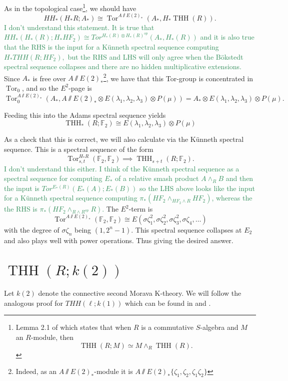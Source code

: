\documentclass[12pt]{amsart}
\newcommand{\mmod}{\! \sslash \!}
\newcommand{\F}{\mathbb{F}}
\DeclareMathOperator{\Tor}{Tor}
\DeclareMathOperator{\THH}{THH}
\def \AE2{A\mmod E(2)_*}
\renewcommand{\AE}[1]{A\mmod E(#1)_*}
\theoremstyle{definition}
\numberwithin{equation}{section}
\numberwithin{figure}{section}
\begin{document}
As in the topological case\footnote{Lemma 2.1 of \cite{THHkuko} which states that when $R$ is a commutative $S$-algebra and $M$ an $R$-module, then 
\[
\THH(R;M)\simeq M\wedge_R\THH(R).
\]}, we should have 
\[
HH_*(H_*R; A_*)\cong \Tor^{\AE{2}}(A_*, H_*\THH(R)).
\]
\textcolor{seagreen}{ I don't understand this statement. It is true that $HH_*(H_*(R);H_*HF_2)\cong Tor^{H_*(R)\otimes H_*(R)^{op}}(A_*,H_*(R))$ and it is also true that the RHS is the input for a K\"unneth spectral sequence computing $H_*THH(R;HF_2),$ but the RHS and LHS will only agree when the B\"okstedt spectral sequence collapses and there are no hidden multiplicative extensions.}
Since $A_*$ is free over $\AE{2}$\footnote{Indeed, as an $\AE{2}$-module it is $\AE{2}\{\zeta_1, \zeta_2, \zeta_1\zeta_2\}$}, we have that this Tor-group is concentrated in $\Tor_0$, and so the $E^2$-page is 
\[
\Tor_0^{\AE{2}}(A_*, \AE{2}\otimes E(\lambda_1, \lambda_2, \lambda_3)\otimes P(\mu)) = A_*\otimes E(\lambda_1, \lambda_2, \lambda_3)\otimes P(\mu).
\]

Feeding this into the Adams spectral sequence yields 
\[
\THH_*(R;\F_2)\cong E(\lambda_1, \lambda_2, \lambda_3)\otimes P(\mu)
\]

As a check that this is correct, we will also calculate via the K\"unneth spectral sequence. This is a spectral sequence of the form 
\[
\Tor_{s,t}^{H_*R}(\F_2, \F_2)\implies \THH_{s+t}(R;\F_2).
\]
\textcolor{seagreen}{
 I don't understand this either. I think of the K\"unneth spectral sequence as a spectral sequence for computing $E_*$ of a relative smash product $A\wedge_R B$ and then the input is $Tor^{E_*(R)}(E_*(A);E_*(B))$ so the LHS above looks like the input for a K\"unneth spectral sequence computing $\pi_*(HF_2\wedge_{HF_2\wedge R} HF_2)$, whereas the the RHS is $\pi_*(HF_2\wedge_{R\wedge R^{op}} R)$.} 
The $E^2$-term is
\[
\Tor^{\AE{2}}(\F_2, \F_2)\cong E(\sigma\zeta_1^2, \sigma\zeta_2^2, \sigma\zeta_3^2, \sigma\zeta_4, \ldots )
\]
with the degree of $\sigma\zeta_n$ being $(1, 2^n-1)$. This spectral sequence collapses at $E_2$ and also plays well with power operations. Thus giving the desired answer. 

\section{$\THH(R;k(2))$}

Let $k(2)$ denote the connective second Morava K-theory. We will follow the analogous proof for $THH(\ell;k(1))$ which can be found in \cite{McClureStaffeldt} and \cite{hopfalgTHH}. 
\end{document}
